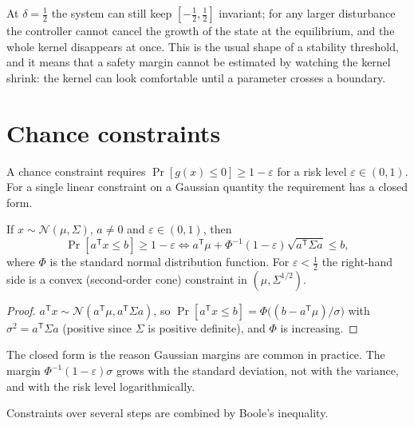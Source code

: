 At $\delta=\tfrac12$ the system can still keep $[-\tfrac12,\tfrac12]$ invariant; for any larger disturbance the controller cannot cancel the growth of the state at the equilibrium, and the whole kernel disappears at once. This is the usual shape of a stability threshold, and it means that a safety margin cannot be estimated by watching the kernel shrink: the kernel can look comfortable until a parameter crosses a boundary.

\section{Chance constraints}

A chance constraint requires $\Pr[g(x)\le0]\ge1-\varepsilon$ for a risk level $\varepsilon\in(0,1)$. For a single linear constraint on a Gaussian quantity the requirement has a closed form.

\begin{established}\label{thm:gauss}
If $x\sim\mathcal N(\mu,\Sigma)$, $a\ne0$ and $\varepsilon\in(0,1)$, then
\[
\Pr[a^{\mathsf T}x\le b]\ge1-\varepsilon\iff a^{\mathsf T}\mu+\Phi^{-1}(1-\varepsilon)\sqrt{a^{\mathsf T}\Sigma a}\le b,
\]
where $\Phi$ is the standard normal distribution function. For $\varepsilon<\tfrac12$ the right-hand side is a convex (second-order cone) constraint in $(\mu,\Sigma^{1/2})$.
\end{established}
\begin{proof}
$a^{\mathsf T}x\sim\mathcal N(a^{\mathsf T}\mu,a^{\mathsf T}\Sigma a)$, so $\Pr[a^{\mathsf T}x\le b]=\Phi\bigl((b-a^{\mathsf T}\mu)/\sigma\bigr)$ with $\sigma^2=a^{\mathsf T}\Sigma a$ (positive since $\Sigma$ is positive definite), and $\Phi$ is increasing.
\end{proof}

The closed form is the reason Gaussian margins are common in practice. The margin $\Phi^{-1}(1-\varepsilon)\sigma$ grows with the standard deviation, not with the variance, and with the risk level logarithmically.

Constraints over several steps are combined by Boole's inequality.

